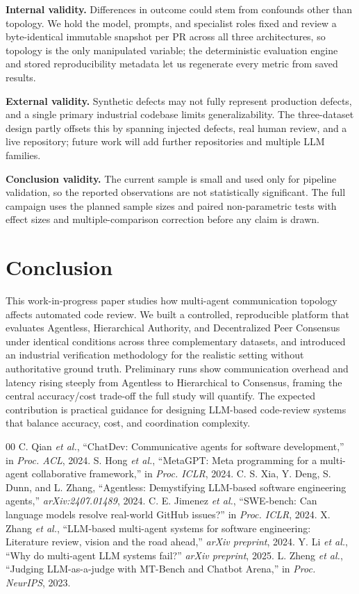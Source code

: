 \documentclass[conference]{IEEEtran}
\begin{document}
\textbf{Internal validity.} Differences in outcome could stem from confounds other
than topology. We hold the model, prompts, and specialist roles fixed and review a
byte-identical immutable snapshot per PR across all three architectures, so
topology is the only manipulated variable; the deterministic evaluation engine and
stored reproducibility metadata let us regenerate every metric from saved results.

\textbf{External validity.} Synthetic defects may not fully represent production
defects, and a single primary industrial codebase limits generalizability. The
three-dataset design partly offsets this by spanning injected defects, real human
review, and a live repository; future work will add further repositories and
multiple LLM families.

\textbf{Conclusion validity.} The current sample is small and used only for
pipeline validation, so the reported observations are not statistically
significant. The full campaign uses the planned sample sizes and paired
non-parametric tests with effect sizes and multiple-comparison correction before
any claim is drawn.

\section{Conclusion}
This work-in-progress paper studies how multi-agent communication topology affects
automated code review. We built a controlled, reproducible platform that evaluates
Agentless, Hierarchical Authority, and Decentralized Peer Consensus under identical
conditions across three complementary datasets, and introduced an industrial
verification methodology for the realistic setting without authoritative ground
truth. Preliminary runs show communication overhead and latency rising steeply from
Agentless to Hierarchical to Consensus, framing the central accuracy/cost trade-off
the full study will quantify. The expected contribution is practical guidance for
designing LLM-based code-review systems that balance accuracy, cost, and
coordination complexity.

\begin{thebibliography}{00}
 C. Qian \emph{et al.}, ``ChatDev: Communicative agents for
software development,'' in \emph{Proc. ACL}, 2024.
 S. Hong \emph{et al.}, ``MetaGPT: Meta programming for a
multi-agent collaborative framework,'' in \emph{Proc. ICLR}, 2024.
 C. S. Xia, Y. Deng, S. Dunn, and L. Zhang, ``Agentless:
Demystifying LLM-based software engineering agents,'' \emph{arXiv:2407.01489},
2024.
 C. E. Jimenez \emph{et al.}, ``SWE-bench: Can language models
resolve real-world GitHub issues?'' in \emph{Proc. ICLR}, 2024.
 X. Zhang \emph{et al.}, ``LLM-based multi-agent systems for
software engineering: Literature review, vision and the road ahead,''
\emph{arXiv preprint}, 2024.
 Y. Li \emph{et al.}, ``Why do multi-agent LLM systems fail?''
\emph{arXiv preprint}, 2025.
 L. Zheng \emph{et al.}, ``Judging LLM-as-a-judge with MT-Bench
and Chatbot Arena,'' in \emph{Proc. NeurIPS}, 2023.
\end{thebibliography}
\end{document}
